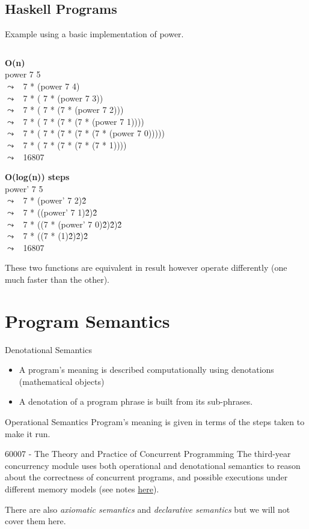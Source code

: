 \subsection{Haskell Programs}
Example using a basic implementation of power.
\inputminted{haskell}{introduction/code/power.hs}

\newcommand{\step}[1]{$\leadsto$ \ #1\\}

\begin{minipage}{.5\textwidth}
	\textbf{O(n)} \\
	power 7 5 \\
	\step{7 * (power 7 4)}
	\step{7 * ( 7 * (power 7 3))}
	\step{7 * ( 7 * (7 * (power 7 2)))}
	\step{7 * ( 7 * (7 * (7 * (power 7 1))))}
	\step{7 * ( 7 * (7 * (7 * (7 * (power 7 0)))))}
	\step{7 * ( 7 * (7 * (7 * (7 * 1))))}
	\step{16807}
\end{minipage} \begin{minipage}{.5\textwidth}
	\textbf{O(log(n)) steps} \\
	power' 7 5 \\
	\step{7 * (power' 7 2)\^2}
	\step{7 * ((power' 7 1)\^2)\^2}
	\step{7 * ((7 * (power' 7 0)\^2)\^2)\^2}
	\step{7 * ((7 * (1)\^2)\^2)\^2}
	\step{16807}
\end{minipage}

These two functions are equivalent in result however operate differently (one much faster than the other).

\section{Program Semantics}
\begin{definitionbox}{Denotational Semantics}
    \begin{itemize}
        \item A program's meaning is described computationally using denotations (mathematical objects)
        \item A denotation of a program phrase is built from its sub-phrases.
    \end{itemize}    
\end{definitionbox}
\begin{definitionbox}{Operational Semantics}
    Program's meaning is given in terms of the steps taken to make it run.
\end{definitionbox}
\begin{sidenotebox}{60007 - The Theory and Practice of Concurrent Programming}
	The third-year concurrency module uses both operational and denotational semantics to reason about the correctness of concurrent programs, and possible executions under different memory models (see notes \href{https://oliverkillane.github.io/Imperial-Computing-Notes/60007%20-%20Theory%20and%20Practice%20of%20Concurrent%20Programming/}{here}).
\end{sidenotebox}
\noindent There are also \textit{axiomatic semantics} and \textit{declarative semantics} but we will not cover them here.

